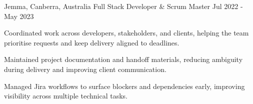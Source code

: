 \begin{cventries}
  \cventry
    {Jemma, Canberra, Australia} %
    {Full Stack Developer \& Scrum Master} %
    {} %
    {Jul 2022 - May 2023} %
    {
      \begin{cvitems} %
        \item {Coordinated work across developers, stakeholders, and clients, helping the team prioritise requests and keep delivery aligned to deadlines.}
        \item {Maintained project documentation and handoff materials, reducing ambiguity during delivery and improving client communication.}
        \item {Managed Jira workflows to surface blockers and dependencies early, improving visibility across multiple technical tasks.}
      \end{cvitems}
    }

\end{cventries}
